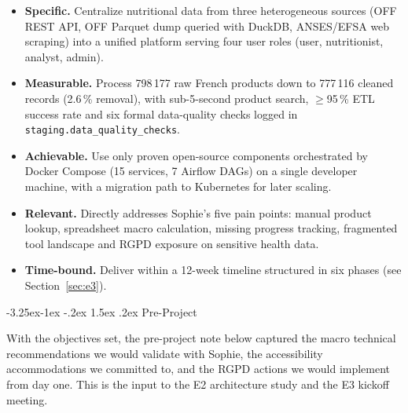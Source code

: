 \documentclass[a4paper,11pt,oneside,openany]{report}
\makeatletter
\renewcommand\subsection{\@startsection{subsection}{2}{\z@}%
  {-3.25ex\@plus -1ex \@minus -.2ex}%
  {1.5ex \@plus .2ex}%
  {\normalfont\large\bfseries\color{ntdarkgreen}}}
\newcommand{\rgpd}{RGPD}
\makeatother
\begin{document}
\begin{itemize}[nosep]
  \item \textbf{Specific.} Centralize nutritional data from three
        heterogeneous sources (OFF REST API, OFF Parquet dump
        queried with DuckDB, ANSES/EFSA web scraping) into a
        unified platform serving four user roles (user, nutritionist,
        analyst, admin).
  \item \textbf{Measurable.} Process 798\,177 raw French products
        down to 777\,116 cleaned records (2.6\,\% removal), with
        sub-5-second product search, $\geq$95\,\% ETL success rate
        and six formal data-quality checks logged in
        \texttt{staging.data\_quality\_checks}.
  \item \textbf{Achievable.} Use only proven open-source
        components orchestrated by Docker Compose (15 services,
        7 Airflow DAGs) on a single developer machine, with a
        migration path to Kubernetes for later scaling.
  \item \textbf{Relevant.} Directly addresses Sophie's five pain
        points: manual product lookup, spreadsheet macro
        calculation, missing progress tracking, fragmented tool
        landscape and \rgpd{} exposure on sensitive health data.
  \item \textbf{Time-bound.} Deliver within a 12-week timeline
        structured in six phases (see Section~\ref{sec:e3}).
\end{itemize}

\subsection{Pre-Project}

With the objectives set, the pre-project note below captured the
macro technical recommendations we would validate with Sophie, the
accessibility accommodations we committed to, and the \rgpd{}
actions we would implement from day one. This is the input to the
E2 architecture study and the E3 kickoff meeting.
\end{document}
